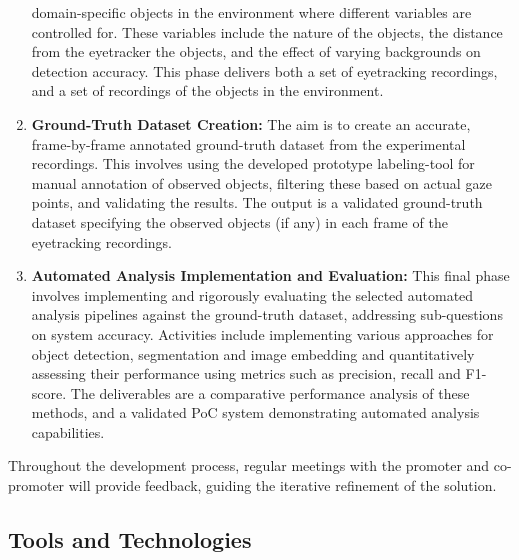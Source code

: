 \documentclass[english]{hogent-article}
\begin{document}
\begin{enumerate}
    domain-specific objects in the environment where different variables are controlled for.
    These variables include the nature of the objects, the distance from the eyetracker the objects, and the effect of varying backgrounds on detection accuracy.
    This phase delivers both a set of eyetracking recordings, and a set of recordings of the objects in the environment.
    \item \textbf{Ground-Truth Dataset Creation:}
    The aim is to create an accurate, frame-by-frame annotated ground-truth dataset from the experimental recordings. 
    This involves using the developed prototype labeling-tool for manual annotation of observed objects, 
    filtering these based on actual gaze points, and validating the results.
    The output is a validated ground-truth dataset specifying the observed objects (if any) in each frame of the eyetracking recordings.
    \item \textbf{Automated Analysis Implementation and Evaluation:}
    This final phase involves implementing and rigorously evaluating the selected automated analysis pipelines 
    against the ground-truth dataset, addressing sub-questions on system accuracy.
    Activities include implementing various approaches for object detection, segmentation and image embedding and quantitatively 
    assessing their performance using metrics such as precision, recall and F1-score. 
    The deliverables are a comparative performance analysis of these methods, and a validated PoC system demonstrating automated analysis capabilities.
\end{enumerate}

Throughout the development process, regular meetings with the promoter and co-promoter will provide feedback, guiding the iterative refinement of the solution.

\subsection{Tools and Technologies}
\end{document}

